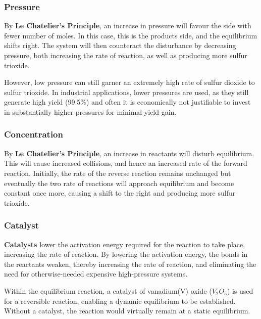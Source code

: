 \documentclass[12pt, a4paper]{article}
\begin{document}
\subsubsection{Pressure}

By \textbf{Le Chatelier's Principle}, an increase in pressure will favour the side with fewer number of moles. In this case, this is the products side, and the equilibrium shifts right. The system will then counteract the disturbance by decreasing pressure, both increasing the rate of reaction, as well as producing more sulfur trioxide.

However, low pressure can still garner an extremely high rate of sulfur dioxide to sulfur trioxide. In industrial applications, lower pressures are used, as they still generate high yield (99.5\%) and often it is economically not justifiable to invest in substantially higher pressures for minimal yield gain.






\subsubsection{Concentration}

By \textbf{Le Chatelier's Principle}, an increase in reactants will disturb equilibrium. This will cause increased collisions, and hence an increased rate of the forward reaction. Initially, the rate of the reverse reaction remains unchanged but eventually the two rate of reactions will approach equilibrium and become constant once more, causing a shift to the right and producing more sulfur trioxide. 






\subsubsection{Catalyst}

\textbf{Catalysts} lower the activation energy required for the reaction to take place, increasing the rate of reaction. By lowering the activation energy, the bonds in the reactants weaken, thereby increasing the rate of reaction, and eliminating the need for otherwise-needed expensive high-pressure systems.

Within the equilibrium reaction, a catalyst of vanadium(V) oxide (\(V_{2}O_{5}\)) is used for a reversible reaction, enabling a dynamic equilibrium to be established. Without a catalyst, the reaction would virtually remain at a static equilibrium.
\end{document}
